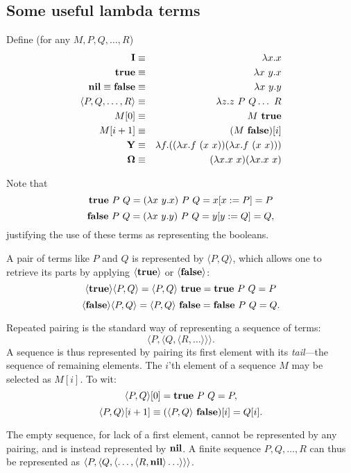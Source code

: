 \documentclass{article}
\newcommand{\tup}[1]{\langle #1 \rangle}
\newcommand{\idx}[2]{#1[#2]}
\newcommand{\Ct}{{\bf true}}
\newcommand{\Cf}{{\bf false}}
\newcommand{\CY}{{\bf Y}}
\newcommand{\CI}{{\bf I}}
\newcommand{\COm}{{\bf \Omega}}
\newcommand{\Cnil}{{\bf nil}}
\newcommand{\Csucc}{{\bf succ}}
\newcommand{\Cnull}{{\bf null}}
\begin{document}
\subsection{Some useful lambda terms}
Define (for any $M,P,Q,\ldots,R$)
\begin{eqnarray*}
\CI & \equiv & \lambda x.x \\
\Ct & \equiv & \lambda x\ y. x \\
\Cnil \equiv \Cf & \equiv & \lambda x\ y. y \\
\tup{P,Q,\ldots,R} & \equiv & \lambda z.z\ P\ Q \ldots\ R \\
\idx{M}{0} & \equiv & M\ \Ct \\
\idx{M}{i+1} & \equiv & \idx{(M\ \Cf)}{i} \\
\CY & \equiv & \lambda f.((\lambda x.f\ (x\ x))(\lambda x.f\ (x\ x))) \\
\COm & \equiv & (\lambda x.x\ x)(\lambda x.x\ x)
\end{eqnarray*}

Note that
\[ \Ct\ P\ Q = (\lambda x\ y.x)\ P\ Q = x[x:=P] = P \]
\[ \Cf\ P\ Q = (\lambda x\ y.y)\ P\ Q = y[y:=Q] = Q, \]
justifying the use of these terms as representing the booleans.

A pair of terms like $P$ and $Q$ is represented by $\tup{P,Q}$, which
allows one to retrieve its parts by applying $\tup{\Ct}$ or $\tup{\Cf}$:
\[ \tup{\Ct} \tup{P,Q} = \tup{P,Q}\ \Ct = \Ct\ P\ Q = P\]
\[ \tup{\Cf} \tup{P,Q} = \tup{P,Q}\ \Cf = \Cf\ P\ Q = Q.\]

Repeated pairing is the standard way of representing a sequence
of terms: \[\tup{P,\tup{Q,\tup{R,\ldots}}}.\]
A sequence is thus represented by pairing its first element
with its {\em tail}---the sequence of remaining elements.
The $i$'th element of a sequence $M$ may be selected as
$\idx{M}{i}$. To wit:
\[ \idx{\tup{P,Q}}{0} = \Ct\ P\ Q = P, \]
\[ \idx{\tup{P,Q}}{i+1} \equiv \idx{(\tup{P,Q}\ \Cf)}{i} = \idx{Q}{i}. \]

The empty sequence, for lack of a first element, cannot be
represented by any pairing, and is instead represented by $\Cnil$.
A finite sequence $P,Q,\ldots, R$ can thus be represented as
$\tup{P,\tup{Q,\tup{\ldots,\tup{R,\Cnil}\ldots}}}$.
\end{document}
